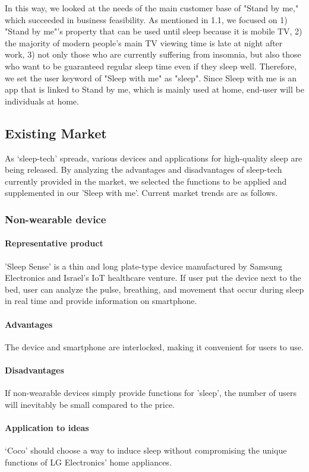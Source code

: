 \documentclass[conference]{IEEEtran}
\begin{document}
In this way, we looked at the needs of the main customer base of "Stand by me," which succeeded in business feasibility. As mentioned in 1.1, we focused on 1) "Stand by me"'s property that can be used until sleep because it is mobile TV, 2) the majority of modern people's main TV viewing time is late at night after work, 3) not only those who are currently suffering from insomnia, but also those who want to be guaranteed regular sleep time even if they sleep well. Therefore, we set the user keyword of "Sleep with me" as "sleep". Since Sleep with me is an app that is linked to Stand by me, which is mainly used at home, end-user will be individuals at home.
\vspace{1\baselineskip}
\subsection{Existing Market}
As ‘sleep-tech’ spreads, various devices and applications for high-quality sleep are being released. By analyzing the advantages and disadvantages of sleep-tech currently provided in the market, we selected the functions to be applied and supplemented in our 'Sleep with me'. Current market trends are as follows.
\vspace{1\baselineskip}
\subsubsection{Non-wearable device}
\paragraph{Representative product}
'Sleep Sense' is a thin and long plate-type device manufactured by Samsung Electronics and Israel's IoT healthcare venture. If user put the device next to the bed, user can analyze the pulse, breathing, and movement that occur during sleep in real time and provide information on smartphone.
\paragraph{Advantages}
The device and smartphone are interlocked, making it convenient for users to  use.
\paragraph{Disadvantages}
If non-wearable devices simply provide functions for 'sleep', the number of users will inevitably be small compared to the price.
\paragraph{Application to ideas}
‘Coco’ should choose a way to induce sleep without compromising the unique functions of LG Electronics' home appliances.
\vspace{1\baselineskip}
\end{document}
